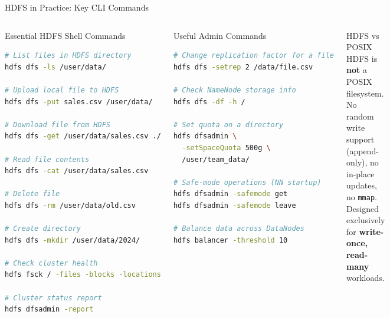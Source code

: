 \documentclass[aspectratio=169,10pt]{beamer}
\begin{document}
\begin{frame}[fragile]{HDFS in Practice: Key CLI Commands}
  \begin{columns}[T]
      \begin{block}{Essential HDFS Shell Commands}
        \vspace{4pt}
        \begin{lstlisting}[language=bash]
# List files in HDFS directory
hdfs dfs -ls /user/data/

# Upload local file to HDFS
hdfs dfs -put sales.csv /user/data/

# Download file from HDFS
hdfs dfs -get /user/data/sales.csv ./

# Read file contents
hdfs dfs -cat /user/data/sales.csv

# Delete file
hdfs dfs -rm /user/data/old.csv

# Create directory
hdfs dfs -mkdir /user/data/2024/

# Check cluster health
hdfs fsck / -files -blocks -locations

# Cluster status report
hdfs dfsadmin -report
        \end{lstlisting}
      \end{block}

      \begin{exampleblock}{Useful Admin Commands}
        \vspace{4pt}
        \begin{lstlisting}[language=bash]
# Change replication factor for a file
hdfs dfs -setrep 2 /data/file.csv

# Check NameNode storage info
hdfs dfs -df -h /

# Set quota on a directory
hdfs dfsadmin \
  -setSpaceQuota 500g \
  /user/team_data/

# Safe-mode operations (NN startup)
hdfs dfsadmin -safemode get
hdfs dfsadmin -safemode leave

# Balance data across DataNodes
hdfs balancer -threshold 10
        \end{lstlisting}
      \end{exampleblock}
      \vspace{4pt}
      \begin{alertblock}{HDFS vs POSIX}
        HDFS is \textbf{not} a POSIX filesystem.  No random write support (append-only), no in-place updates, no \texttt{mmap}.  Designed exclusively for \textbf{write-once, read-many} workloads.
      \end{alertblock}
  \end{columns}
\end{frame}
\end{document}
